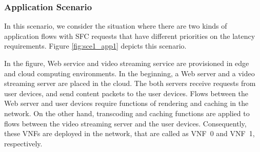 \documentclass[technicalreport]{ieicej}
\begin{document}
	\subsubsection{Application Scenario}
	In this scenario, we consider the situation where there are two kinds of application flows with SFC requests that have different priorities on the latency requirements.
	Figure \ref{fig:sce1_app1} depicts this scenario.
	\begin{figure*}[!t]
		\centering
		\caption{Scenario1: Placement of VNFs considering flow priorities}
		\label{fig:sce1_app1}
	\end{figure*}
	In the figure, Web service and video streaming service are provisioned in edge and cloud computing environments.
	In the beginning, a Web server and a video streaming server are placed in the cloud.
	The both servers receive requests from user devices, and send content packets to the user devices.
	Flows between the Web server and user devices require functions of rendering and caching in the network.
	On the other hand, transcoding and caching functions are applied to flows between the video streaming server and the user devices.
	Consequently, these VNFs are deployed in the network, that are called as VNF~0 and VNF~1, respectively.
\end{document}
